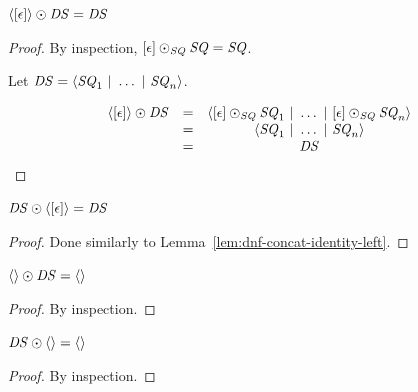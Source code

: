 \documentclass[acmsmall]{acmart}
\begin{document}
\begin{lemma}
  \label{lem:dnf-concat-identity-left}
  $\langle[\epsilon]\rangle \odot \mathit{DS} = \mathit{DS}$
\end{lemma}
\begin{proof}
  By inspection,
  $[\epsilon] \odot_{\mathit{SQ}} \mathit{SQ} = \mathit{SQ}$.

  Let $\mathit{DS} = \langle\mathit{SQ}_1 ~|~ \ldots ~|~ \mathit{SQ}_n\rangle$.

  \[
    \begin{array}{ccc}
      \langle[\epsilon]\rangle \odot \mathit{DS}
      & = & \langle[\epsilon]\odot_{\mathit{SQ}}\mathit{SQ}_1 ~|~ 
            \ldots ~|~ [\epsilon]\odot_{\mathit{SQ}}\mathit{SQ}_n\rangle\\
      & = & \langle\mathit{SQ}_1 ~|~ \ldots ~|~ \mathit{SQ}_n\rangle\\
      & = & \mathit{DS}
    \end{array}
  \]
\end{proof}

\begin{lemma}
  \label{lem:dnf-concat-identity-right}
  $\mathit{DS} \odot \langle[\epsilon]\rangle = \mathit{DS}$
\end{lemma}
\begin{proof}
  Done similarly to Lemma~\ref{lem:dnf-concat-identity-left}.
\end{proof}

\begin{lemma}
  \label{lem:dnf-concat-projection-left}
  $\langle\rangle \odot \mathit{DS} = \langle\rangle$
\end{lemma}
\begin{proof}
  By inspection.
\end{proof}

\begin{lemma}
  \label{lem:dnf-concat-projection-right}
  $\mathit{DS} \odot \langle\rangle = \langle\rangle$
\end{lemma}
\begin{proof}
  By inspection.
\end{proof}
\end{document}
